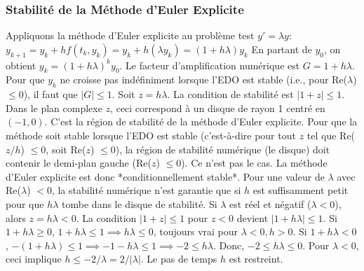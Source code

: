 \documentclass{article}
\begin{document}
\subsubsection*{Stabilité de la Méthode d'Euler Explicite}

Appliquons la méthode d'Euler explicite au problème test $y' = \lambda y$:
$y_{k+1} = y_k + h f(t_k, y_k) = y_k + h (\lambda y_k) = (1 + h\lambda) y_k$
En partant de $y_0$, on obtient $y_k = (1 + h\lambda)^k y_0$.
Le facteur d'amplification numérique est $G = 1 + h\lambda$. Pour que $y_k$ ne croisse pas indéfiniment lorsque l'EDO est stable (i.e., pour Re($\lambda$) $\le 0$), il faut que $|G| \le 1$.
Soit $z = h\lambda$. La condition de stabilité est $|1 + z| \le 1$.
Dans le plan complexe $z$, ceci correspond à un disque de rayon 1 centré en $(-1, 0)$. C'est la région de stabilité de la méthode d'Euler explicite.
Pour que la méthode soit stable lorsque l'EDO est stable (c'est-à-dire pour tout $z$ tel que Re($z/h$) $\le 0$, soit Re($z$) $\le 0$), la région de stabilité numérique (le disque) doit contenir le demi-plan gauche (Re($z$) $\le 0$). Ce n'est pas le cas.
La méthode d'Euler explicite est donc *conditionnellement stable*. Pour une valeur de $\lambda$ avec Re($\lambda$) $< 0$, la stabilité numérique n'est garantie que si $h$ est suffisamment petit pour que $h\lambda$ tombe dans le disque de stabilité. Si $\lambda$ est réel et négatif ($\lambda < 0$), alors $z = h\lambda < 0$. La condition $|1+z| \le 1$ pour $z < 0$ devient $|1+h\lambda| \le 1$. Si $1+h\lambda \ge 0$, $1+h\lambda \le 1 \implies h\lambda \le 0$, toujours vrai pour $\lambda < 0, h>0$. Si $1+h\lambda < 0$, $-(1+h\lambda) \le 1 \implies -1-h\lambda \le 1 \implies -2 \le h\lambda$. Donc, $-2 \le h\lambda \le 0$. Pour $\lambda < 0$, ceci implique $h \le -2/\lambda = 2/|\lambda|$. Le pas de temps $h$ est restreint.
\end{document}
